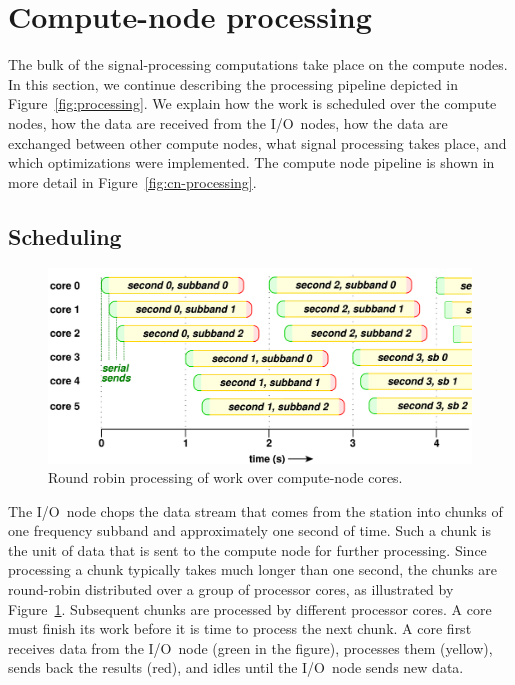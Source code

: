 \documentclass{sig-alternate}
\begin{document}
\section{Compute-node processing}
\label{sec:CNProc}

The bulk of the signal-processing computations take place on the compute nodes.
In this section, we continue describing the processing pipeline depicted in
Figure~\ref{fig:processing}. 
We explain how the work is scheduled over the compute nodes, how the data are
received from the I/O~nodes, how the data are exchanged between other compute
nodes, what signal processing takes place, and which optimizations were
implemented.
The compute node pipeline is shown in more detail in
Figure~\ref{fig:cn-processing}.


\subsection{Scheduling}

\begin{figure}[ht]
\includegraphics[width=\columnwidth]{round-robin.pdf}
\caption{Round robin processing of work over compute-node cores.}
\label{fig:round-robin}
\end{figure}

The I/O~node chops the data stream that comes from the station into chunks of
one frequency subband and approximately one second of time.
Such a chunk is the unit of data that is sent to the compute node for further
processing.
Since processing a chunk typically takes much longer than one second,
the chunks are round-robin distributed over a group of processor cores,
as illustrated by Figure~\ref{fig:round-robin}.
Subsequent chunks are processed by different processor cores.
A core must finish its work before it is time to process the next chunk.
A core first receives data from the I/O~node (green in the figure),
processes them (yellow), sends back the results (red), and idles until the
I/O~node sends new data.
\end{document}
